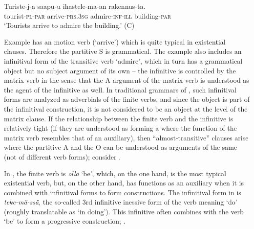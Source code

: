 \documentclass[output=paper]{LSP/langsci}
\begin{document}
\ea\label{15-hu-ex:29}
\gll Turiste-j-a saapu-u ihastele-ma-an rakennus-ta.\\
tourist-\textsc{pl}-\textsc{par} arrive-\textsc{prs}.\textsc{3sg} admire-\textsc{inf}-\textsc{ill} building-\textsc{par}\\
\glt ‘Tourists arrive to admire the building.’ (C)
\z

Example  has an  motion verb (‘arrive’) which is quite typical in existential clauses. Therefore the partitive S is grammatical. The example also includes an infinitival form of the transitive verb ‘admire’, which in turn has a grammatical object but no subject argument of its own – the infinitive is controlled by the matrix verb in the sense that the A argument of the matrix verb is understood as the agent of the infinitive as well. In traditional grammars of , such infinitival forms are analyzed as adverbials of the finite verbs, and since the object is part of the infinitival construction, it is not considered to be an object at the level of the matrix clause. If the relationship between the finite verb and the infinitive is relatively tight (\ie if they are understood as forming a  where the function of the matrix verb resembles that of an auxiliary), then “almost-transitive” clauses arise where the partitive A and the O can be understood as arguments of the same  (not of different verb forms); consider .


In , the finite verb is \textit{olla} ‘be’, which, on the one hand, is the most typical existential verb, but, on the other hand, has functions as an auxiliary when it is combined with infinitival forms to form  constructions. The infinitival form in  is \textit{teke-mä-ssä}, the so-called 3rd infinitive inessive form of the verb meaning ‘do’ (roughly translatable as ‘in doing’). This infinitive often combines with the verb ‘be’ to form a progressive construction; \cf {}.
\end{document}
